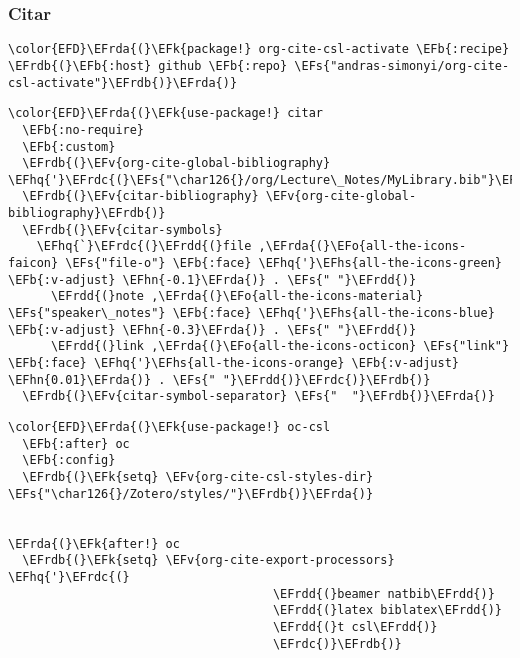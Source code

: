 \documentclass[c]{article}
\theoremstyle{plain}%
\theoremstyle{definition}
\theoremstyle{remark}
\newcommand{\EFs}[1]{\textcolor{EFs}{#1}} %
\newcommand{\EFk}[1]{\textcolor{EFk}{#1}} %
\newcommand{\EFb}[1]{\textcolor{EFb}{#1}} %
\newcommand{\EFv}[1]{\textcolor{EFv}{#1}} %
\newcommand{\EFo}[1]{\textcolor{EFo}{#1}} %
\newcommand{\EFhn}[1]{\textcolor{EFhn}{#1}} %
\newcommand{\EFhq}[1]{\textcolor{EFhq}{#1}} %
\newcommand{\EFhs}[1]{\textcolor{EFhs}{#1}} %
\newcommand{\EFrda}[1]{\textcolor{EFrda}{#1}} %
\newcommand{\EFrdb}[1]{\textcolor{EFrdb}{#1}} %
\newcommand{\EFrdc}[1]{\textcolor{EFrdc}{#1}} %
\newcommand{\EFrdd}[1]{\textcolor{EFrdd}{#1}} %
\begin{document}
\subsubsection{Citar}
\label{sec:orgade0980}
\begin{Code}
\begin{Verbatim}
\color{EFD}\EFrda{(}\EFk{package!} org-cite-csl-activate \EFb{:recipe} \EFrdb{(}\EFb{:host} github \EFb{:repo} \EFs{"andras-simonyi/org-cite-csl-activate"}\EFrdb{)}\EFrda{)}
\end{Verbatim}
\end{Code}
\begin{Code}
\begin{Verbatim}
\color{EFD}\EFrda{(}\EFk{use-package!} citar
  \EFb{:no-require}
  \EFb{:custom}
  \EFrdb{(}\EFv{org-cite-global-bibliography} \EFhq{'}\EFrdc{(}\EFs{"\char126{}/org/Lecture\_Notes/MyLibrary.bib"}\EFrdc{)}\EFrdb{)}
  \EFrdb{(}\EFv{citar-bibliography} \EFv{org-cite-global-bibliography}\EFrdb{)}
  \EFrdb{(}\EFv{citar-symbols}
    \EFhq{`}\EFrdc{(}\EFrdd{(}file ,\EFrda{(}\EFo{all-the-icons-faicon} \EFs{"file-o"} \EFb{:face} \EFhq{'}\EFhs{all-the-icons-green} \EFb{:v-adjust} \EFhn{-0.1}\EFrda{)} . \EFs{" "}\EFrdd{)}
      \EFrdd{(}note ,\EFrda{(}\EFo{all-the-icons-material} \EFs{"speaker\_notes"} \EFb{:face} \EFhq{'}\EFhs{all-the-icons-blue} \EFb{:v-adjust} \EFhn{-0.3}\EFrda{)} . \EFs{" "}\EFrdd{)}
      \EFrdd{(}link ,\EFrda{(}\EFo{all-the-icons-octicon} \EFs{"link"} \EFb{:face} \EFhq{'}\EFhs{all-the-icons-orange} \EFb{:v-adjust} \EFhn{0.01}\EFrda{)} . \EFs{" "}\EFrdd{)}\EFrdc{)}\EFrdb{)}
  \EFrdb{(}\EFv{citar-symbol-separator} \EFs{"  "}\EFrdb{)}\EFrda{)}

\end{Verbatim}
\end{Code}
\begin{Code}
\begin{Verbatim}
\color{EFD}\EFrda{(}\EFk{use-package!} oc-csl
  \EFb{:after} oc
  \EFb{:config}
  \EFrdb{(}\EFk{setq} \EFv{org-cite-csl-styles-dir} \EFs{"\char126{}/Zotero/styles/"}\EFrdb{)}\EFrda{)}


\EFrda{(}\EFk{after!} oc
  \EFrdb{(}\EFk{setq} \EFv{org-cite-export-processors} \EFhq{'}\EFrdc{(}
                                     \EFrdd{(}beamer natbib\EFrdd{)}
                                     \EFrdd{(}latex biblatex\EFrdd{)}
                                     \EFrdd{(}t csl\EFrdd{)}
                                     \EFrdc{)}\EFrdb{)}
\end{Verbatim}
\end{Code}
\end{document}
